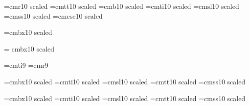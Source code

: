 \begin{\parsearg\beginxxx}
\def\node{\parsearg\nodezzz}
\def\nodezzz#1{\nodexxx [#1,]}
\def\nodexxx[#1,#2]{\gdef\lastnode{#1}}
\let\lastnode=\relax

\def\donoderef{\ifx\lastnode\relax\else
\expandafter\expandafter\expandafter\setref{\lastnode}\fi
\let\lastnode=\relax}

\def\unnumbnoderef{\ifx\lastnode\relax\else
\expandafter\expandafter\expandafter\unnumbsetref{\lastnode}\fi
\let\lastnode=\relax}

\let\refill=\relax

\let\setfilename=\comment

\def\inforef #1{\inforefzzz #1,,,,**}
\def\inforefzzz #1,#2,#3,#4**{See Info file \file{\losespace#3{}}, node `\losespace#1{}'}
\def\losespace #1{#1}



\font\tenrm=cmr10 scaled \magstephalf
\font\tentt=cmtt10 scaled \magstephalf
\font\tenbf=cmb10 scaled \magstephalf 
\font\tenit=cmti10 scaled \magstephalf
\font\tensl=cmsl10 scaled \magstephalf
\font\tensf=cmss10 scaled \magstephalf
\def\li{\sf}
\font\tensc=cmcsc10 scaled \magstephalf

\font{}=cmbx10 scaled  %
\let\deftt=\tentt
\def\df{\let\tt=\deftt \defbf}

\font\titlerm = cmbx10 scaled 

\font\indit=cmti9 \font\indrm=cmr9
\def\indbf{\indrm} \def\indsl{\indit}
\def\indexfonts{\let\it=\indit \let\sl=\indsl \let\bf=\indbf \let\rm=\indrm}

\font\chaprm=cmbx10 scaled 
\font\chapit=cmti10 scaled 
\font\chapsl=cmsl10 scaled 
\font\chaptt=cmtt10 scaled 
\font\chapsf=cmss10 scaled 
\let\chapbf=\chaprm

\font\secrm=cmbx10 scaled 
\font\secit=cmti10 scaled 
\font\secsl=cmsl10 scaled 
\font\sectt=cmtt10 scaled 
\font\secsf=cmss10 scaled 
\let\secbf=\secrm



\end{\parsearg\beginxxx}
